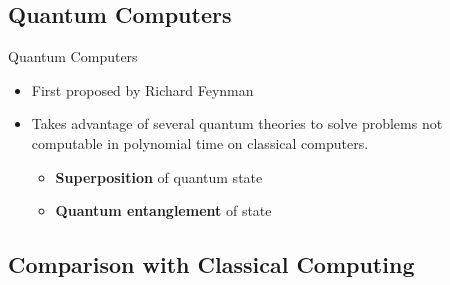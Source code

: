 \documentclass{beamer}
\begin{document}
\subsection{Quantum Computers}
\begin{frame}{Quantum Computers}
	\begin{itemize}
		\item First proposed by Richard Feynman
		\item {
		      Takes advantage of several quantum theories to solve problems not computable in polynomial time on classical computers.
		      }
		      \begin{itemize}
			      \item \textbf{Superposition} of quantum state
			      \item \textbf{Quantum entanglement} of state
		      \end{itemize}
	\end{itemize}
\end{frame}

\subsection{Comparison with Classical Computing}
\end{document}
